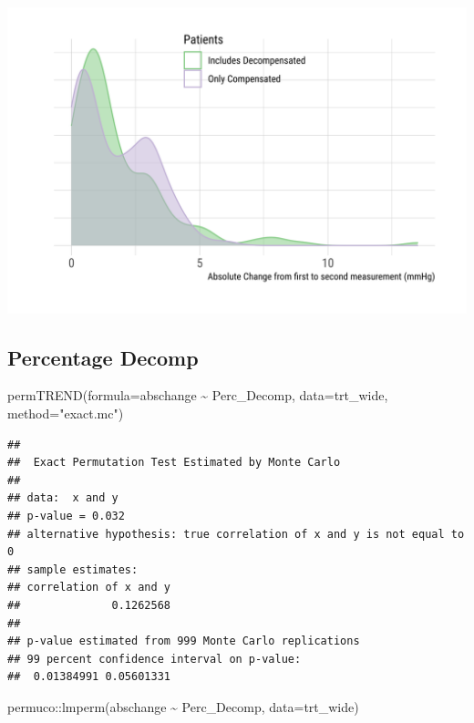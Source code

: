 \documentclass[
]{article}
\newenvironment{Shaded}{\begin{snugshade}}{\end{snugshade}}
\newcommand{\AttributeTok}[1]{\textcolor[rgb]{0.77,0.63,0.00}{#1}}
\newcommand{\FunctionTok}[1]{\textcolor[rgb]{0.00,0.00,0.00}{#1}}
\newcommand{\NormalTok}[1]{#1}
\newcommand{\SpecialCharTok}[1]{\textcolor[rgb]{0.00,0.00,0.00}{#1}}
\newcommand{\StringTok}[1]{\textcolor[rgb]{0.31,0.60,0.02}{#1}}
\begin{document}
\includegraphics{figures/unnamed-chunk-32-2.png}

\hypertarget{percentage-decomp}{%
\subsection{Percentage Decomp}\label{percentage-decomp}}

\begin{Shaded}
\begin{Highlighting}[]
\FunctionTok{permTREND}\NormalTok{(}\AttributeTok{formula=}\NormalTok{abschange }\SpecialCharTok{\textasciitilde{}}\NormalTok{ Perc\_Decomp, }\AttributeTok{data=}\NormalTok{trt\_wide,}
          \AttributeTok{method=}\StringTok{"exact.mc"}\NormalTok{)}
\end{Highlighting}
\end{Shaded}

\begin{verbatim}
## 
##  Exact Permutation Test Estimated by Monte Carlo
## 
## data:  x and y
## p-value = 0.032
## alternative hypothesis: true correlation of x and y is not equal to 0
## sample estimates:
## correlation of x and y 
##              0.1262568 
## 
## p-value estimated from 999 Monte Carlo replications
## 99 percent confidence interval on p-value:
##  0.01384991 0.05601331
\end{verbatim}

\begin{Shaded}
\begin{Highlighting}[]
\NormalTok{permuco}\SpecialCharTok{::}\FunctionTok{lmperm}\NormalTok{(abschange }\SpecialCharTok{\textasciitilde{}}\NormalTok{ Perc\_Decomp, }\AttributeTok{data=}\NormalTok{trt\_wide)}
\end{Highlighting}
\end{Shaded}
\end{document}
